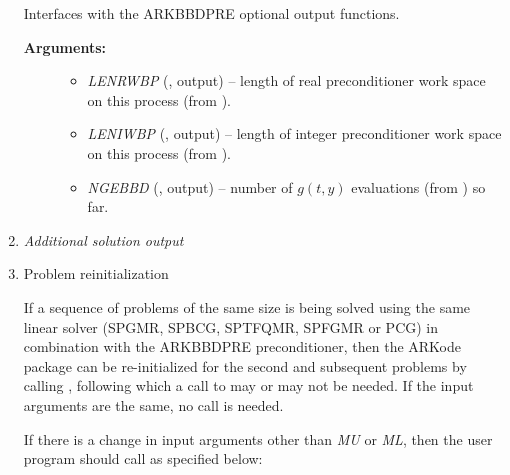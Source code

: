 \documentclass[letterpaper,10pt,english]{sphinxmanual}
\begin{document}
\begin{enumerate}
\begin{fulllineitems}
\label{f_interface/Preconditioning:f/_/FARKBBDOPT}
Interfaces with the ARKBBDPRE optional output functions.
\begin{description}
\item[{\textbf{Arguments:}}] \leavevmode\begin{itemize}
\item {} 
\emph{LENRWBP} (, output) -- length of real
preconditioner work space on this process (from
{\hyperref[c_interface/Preconditioners:ARKBBDPrecGetWorkSpace]{}}).

\item {} 
\emph{LENIWBP} (, output) -- length of integer
preconditioner work space on this process (from
{\hyperref[c_interface/Preconditioners:ARKBBDPrecGetWorkSpace]{}}).

\item {} 
\emph{NGEBBD} (, output) -- number of $g(t,y)$
evaluations (from {\hyperref[c_interface/Preconditioners:ARKBBDPrecGetNumGfnEvals]{}}) so
far.

\end{itemize}

\end{description}

\end{fulllineitems}


\item {} 
\emph{Additional solution output}

\item {} 
Problem reinitialization

If a sequence of problems of the same size is being solved using
the same linear solver (SPGMR, SPBCG, SPTFQMR, SPFGMR or PCG) in
combination with the ARKBBDPRE preconditioner, then the ARKode
package can be re-initialized for the second and subsequent
problems by calling {\hyperref[f_interface/Usage:f/_/FARKREINIT]{}}, following which a call
to {\hyperref[f_interface/Preconditioning:f/_/FARKBBDREINIT]{}} may or may not be needed. If the input
arguments are the same, no {\hyperref[f_interface/Preconditioning:f/_/FARKBBDREINIT]{}} call is
needed.

If there is a change in input arguments other than \emph{MU} or
\emph{ML}, then the user program should call {\hyperref[f_interface/Preconditioning:f/_/FARKBBDREINIT]{}}
as specified below:


\end{enumerate}
\end{document}
